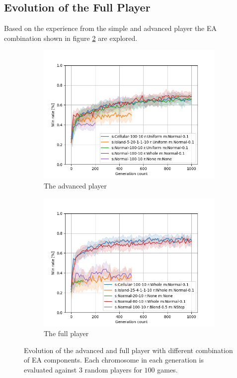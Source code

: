 \documentclass{llncs}
\begin{document}
\subsection{Evolution of the Full Player}
Based on the experience from the simple and advanced player the EA combination shown in figure \ref{subfig:evolution_full_comb} are explored.
\begin{figure}[t]
    \centering
    \begin{subfigure}[t]{0.49\textwidth}
        \centering
        \captionsetup{width=.9\textwidth}
        \includegraphics[width=\textwidth]{figures/advanced/advanced_combination.png}
        \caption{The advanced player}
        \label{subfig:evolution_advanced_comb}
    \end{subfigure}
    \begin{subfigure}[t]{0.49\textwidth}
        \centering
        \captionsetup{width=.9\textwidth}
        \includegraphics[width=\textwidth]{figures/full/ann_combinations.png}
        \caption{The full player}
        \label{subfig:evolution_full_comb}
    \end{subfigure}
    \caption{Evolution of the advanced and full player with different combination of EA components. Each chromosome in each generation is evaluated against $3$ random players for $100$ games.}
    \label{fig:evolution_advanced_full}
\end{figure}
\end{document}
